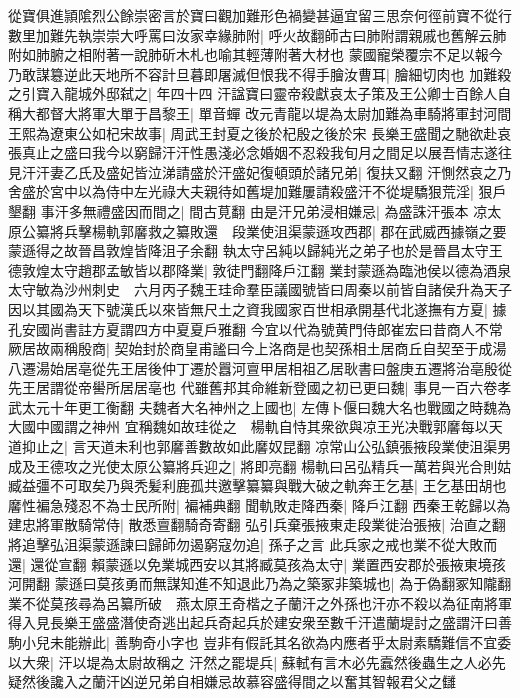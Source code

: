 從寶俱進頴隂烈公餘崇密言於寶曰觀加難形色禍變甚逼宜留三思奈何徑前寶不從行數里加難先執崇崇大呼罵曰汝家幸緣肺附|{
	呼火故翻師古曰肺附謂親戚也舊解云肺附如肺腑之相附著一說肺斫木札也喻其輕薄附著大材也}
蒙國寵榮覆宗不足以報今乃敢謀簒逆此天地所不容計旦暮即屠滅但恨我不得手膾汝曹耳|{
	膾細切肉也}
加難殺之引寶入龍城外邸弑之|{
	年四十四}
汗諡寶曰靈帝殺獻哀太子策及王公卿士百餘人自稱大都督大將軍大單于昌黎王|{
	單音蟬}
改元青龍以堤為太尉加難為車騎將軍封河間王熙為遼東公如杞宋故事|{
	周武王封夏之後於杞殷之後於宋}
長樂王盛聞之馳欲赴哀張真止之盛曰我今以窮歸汗汗性愚淺必念婚姻不忍殺我旬月之間足以展吾情志遂往見汗汗妻乙氏及盛妃皆泣涕請盛於汗盛妃復頓頭於諸兄弟|{
	復扶又翻}
汗惻然哀之乃舍盛於宮中以為侍中左光祿大夫親待如舊堤加難屢請殺盛汗不從堤驕狠荒淫|{
	狠戶墾翻}
事汗多無禮盛因而間之|{
	間古莧翻}
由是汗兄弟浸相嫌忌|{
	為盛誅汗張本}
凉太原公纂將兵擊楊軌郭黁救之纂敗還　段業使沮渠蒙遜攻西郡|{
	郡在武威西據嶺之要蒙遜得之故晉昌敦煌皆降沮子余翻}
執太守呂純以歸純光之弟子也於是晉昌太守王德敦煌太守趙郡孟敏皆以郡降業|{
	敦徒門翻降戶江翻}
業封蒙遜為臨池侯以德為酒泉太守敏為沙州刺史　六月丙子魏王珪命羣臣議國號皆曰周秦以前皆自諸侯升為天子因以其國為天下號漢氏以來皆無尺土之資我國家百世相承開基代北遂撫有方夏|{
	據孔安國尚書註方夏謂四方中夏夏戶雅翻}
今宜以代為號黄門侍郎崔宏曰昔商人不常厥居故兩稱殷商|{
	契始封於商皇甫謐曰今上洛商是也契孫相土居商丘自契至于成湯八遷湯始居亳從先王居後仲丁遷於囂河亶甲居相祖乙居耿書曰盤庚五遷將治亳殷從先王居謂從帝嚳所居居亳也}
代雖舊邦其命維新登國之初已更曰魏|{
	事見一百六卷孝武太元十年更工衡翻}
夫魏者大名神州之上國也|{
	左傳卜偃曰魏大名也戰國之時魏為大國中國謂之神州}
宜稱魏如故珪從之　楊軌自恃其衆欲與凉王光决戰郭黁每以天道抑止之|{
	言天道未利也郭黁善數故如此黁奴昆翻}
凉常山公弘鎮張掖段業使沮渠男成及王德攻之光使太原公纂將兵迎之|{
	將即亮翻}
楊軌曰呂弘精兵一萬若與光合則姑臧益彊不可取矣乃與秃髪利鹿孤共邀擊纂纂與戰大破之軌奔王乞基|{
	王乞基田胡也}
黁性褊急殘忍不為士民所附|{
	褊補典翻}
聞軌敗走降西秦|{
	降戶江翻}
西秦王乾歸以為建忠將軍散騎常侍|{
	散悉亶翻騎奇寄翻}
弘引兵棄張掖東走段業徙治張掖|{
	治直之翻}
將追擊弘沮渠蒙遜諫曰歸師勿遏窮寇勿追|{
	孫子之言}
此兵家之戒也業不從大敗而還|{
	還從宣翻}
賴蒙遜以免業城西安以其將臧莫孩為太守|{
	業置西安郡於張掖東境孩河開翻}
蒙遜曰莫孩勇而無謀知進不知退此乃為之築冢非築城也|{
	為于偽翻冢知隴翻}
業不從莫孩尋為呂纂所破　燕太原王奇楷之子蘭汗之外孫也汗亦不殺以為征南將軍得入見長樂王盛盛潛使奇逃出起兵奇起兵於建安衆至數千汗遣蘭堤討之盛謂汗曰善駒小兒未能辦此|{
	善駒奇小字也}
豈非有假託其名欲為内應者乎太尉素驕難信不宜委以大衆|{
	汗以堤為太尉故稱之}
汗然之罷堤兵|{
	蘇軾有言木必先蠧然後蟲生之人必先疑然後讒入之蘭汗凶逆兄弟自相嫌忌故慕容盛得間之以奮其智報君父之讎}
